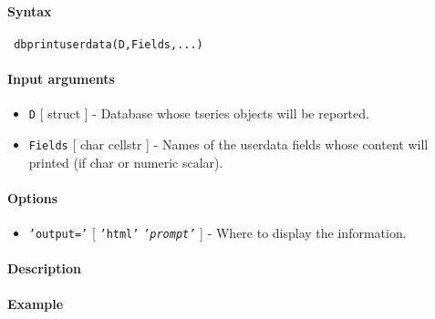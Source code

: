 


	\paragraph{Syntax}
 
 \begin{verbatim}
 dbprintuserdata(D,Fields,...)
 \end{verbatim}
 
 \paragraph{Input arguments}
 
 \begin{itemize}
 \item
   \texttt{D} {[} struct {]} - Database whose tseries objects will be
   reported.
 \item
   \texttt{Fields} {[} char \textbar{} cellstr {]} - Names of the
   userdata fields whose content will printed (if char or numeric
   scalar).
 \end{itemize}
 
 \paragraph{Options}
 
 \begin{itemize}
 \item
   \texttt{'output='} {[} \texttt{'html'} \textbar{}
   \emph{\texttt{'prompt'}} {]} - Where to display the information.
 \end{itemize}
 
 \paragraph{Description}
 
 \paragraph{Example}


